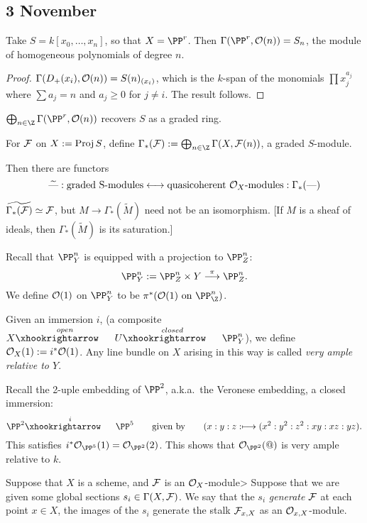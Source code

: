 \documentclass[11pt]{article}
\begin{document}
\begin{Nov3}
\section*{3 November}
\begin{claim}
Take $S=k[x_0,\ldots,x_n]$, so that $X=\PP^r$. Then $\Gamma(\PP^r,\calO(n))=S_n$, the module of homogeneous polynomials of degree $n$.
\begin{proof}
$\Gamma(D_+(x_i),\mathcal{O}(n))=S(n)_{(x_i)}$, which is the $k$-span of the monomials $\prod x_j^{a_j}$ where $\sum a_j=n$ and $a_j\geq0$ for $j\neq i$. The result follows.
\end{proof}
\end{claim}
\begin{cor*}
$\bigoplus_{n\in\Z}\Gamma(\PP^r,\calO(n))$ recovers $S$ as a graded ring.
\end{cor*}
\begin{defn*}
For $\mathcal{F}$ on $X:=\operatorname{Proj} S$, define $\Gamma_*(\calF):=\bigoplus_{n\in\Z}\Gamma(X,\calF(n))$, a graded $S$-module.
\end{defn*}
Then there are functors
\[\widetilde{\textup{---}}:\text{graded S-modules}\longleftrightarrow\text{quasicoherent $\mathcal{O}_X$-modules}:\Gamma_*(\textup{---})\]
\begin{prop*}
$\widetilde{\Gamma_*(\mathcal{F})}\simeq\mathcal{F}$, but $M\to \Gamma_*(\widetilde M)$ need not be an isomorphism. [If $M$ is a sheaf of ideals, then $\Gamma_*(\widetilde M)$ is its saturation.]
\end{prop*}
Recall that $\PP^n_Y$ is equipped with a projection to $\PP^n_Z$:
\[\PP^n_Y:=\PP^n_Z\times Y\overset{\pi}{\to}\PP^n_Z.\]
We define $\mathcal{O}(1)$ on $\PP^n_Y$ to be $\pi^*(\calO(1)\text{ on $\PP^n_\Z$})$.
\begin{defn*}
Given an immersion $i$, (a composite $X\overset{open}{\cofibration} U\overset{closed}{\cofibration} \PP^n_Y$), we define $\mathcal{O}_{X}(1):=i^*\mathcal{O}(1)$. Any line bundle on $X$ arising in this way is called \textit{very ample relative to $Y$}.
\end{defn*}
\begin{exmp*}
Recall the 2-uple embedding of $\PP^2$, a.k.a.\ the Veronese embedding, a closed immersion:
\[\PP^2\overset{i}{\cofibration} \PP^5\text{\qquad given by\qquad}(x:y:z:\mapsto(x^2:y^2:z^2:xy:xz:yz).\]
This satisfies $i^*\calO_{\PP^5}(1)=\calO_{\PP^2}(2)$. This shows that $\calO_{\PP^2}(@)$ is very ample relative to $k$.
\end{exmp*}
\begin{defn*}
Suppose that $X$ is a scheme, and $\mathcal{F}$ is an $\mathcal{O}_X$-module> Suppose that we are given some global sections $s_i\in\Gamma(X,\mathcal{F})$. We say that the $s_i$ \emph{generate} $\mathcal{F}$ \Iff at each point $x\in X$, the images of the $s_i$ generate the stalk $\mathcal{F}_{x,X}$ as an $\mathcal{O}_{x,X}$-module.


\end{defn*}
\end{Nov3}
\end{document}
